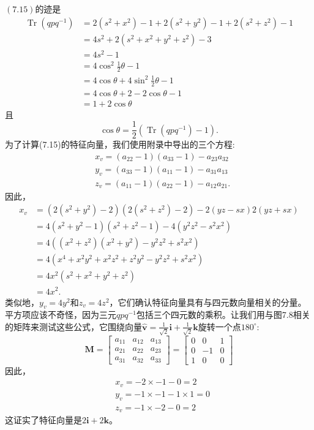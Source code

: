 $(7.15)$的迹是
$$
\begin{aligned}
\operatorname{Tr}\left(q p q^{-1}\right) & =2\left(s^{2}+x^{2}\right)-1+2\left(s^{2}+y^{2}\right)-1+2\left(s^{2}+z^{2}\right)-1 \\
& =4 s^{2}+2\left(s^{2}+x^{2}+y^{2}+z^{2}\right)-3 \\
& =4 s^{2}-1 \\
& =4 \cos ^{2} \frac{1}{2} \theta-1 \\
& =4 \cos \theta+4 \sin ^{2} \frac{1}{2} \theta-1 \\
& =4 \cos \theta+2-2 \cos \theta-1 \\
& =1+2 \cos \theta
\end{aligned}
$$
且
$$
\cos \theta=\frac{1}{2}\left(\operatorname{Tr}\left(q p q^{-1}\right)-1\right) .
$$
为了计算(7.15)的特征向量，我们使用附录中导出的三个方程:
$$
\begin{aligned}
& x_{v}=\left(a_{22}-1\right)\left(a_{33}-1\right)-a_{23} a_{32} \\
& y_{v}=\left(a_{33}-1\right)\left(a_{11}-1\right)-a_{31} a_{13} \\
& z_{v}=\left(a_{11}-1\right)\left(a_{22}-1\right)-a_{12} a_{21} .
\end{aligned}
$$
因此，
$$
\begin{aligned}
x_{v} & =\left(2\left(s^{2}+y^{2}\right)-2\right)\left(2\left(s^{2}+z^{2}\right)-2\right)-2(y z-s x) 2(y z+s x) \\
& =4\left(s^{2}+y^{2}-1\right)\left(s^{2}+z^{2}-1\right)-4\left(y^{2} z^{2}-s^{2} x^{2}\right) \\
& =4\left(\left(x^{2}+z^{2}\right)\left(x^{2}+y^{2}\right)-y^{2} z^{2}+s^{2} x^{2}\right) \\
& =4\left(x^{4}+x^{2} y^{2}+x^{2} z^{2}+z^{2} y^{2}-y^{2} z^{2}+s^{2} x^{2}\right) \\
& =4 x^{2}\left(s^{2}+x^{2}+y^{2}+z^{2}\right) \\
& =4 x^{2} .
\end{aligned}
$$
类似地，$y_{v}= 4y ^{2}$和$z_{v}= 4z ^{2}$，它们确认特征向量具有与四元数向量相关的分量。平方项应该不奇怪，因为三元$q p q^{-1}$包括三个四元数的乘积。让我们用与图7.8相关的矩阵来测试这些公式，它围绕向量$\hat{\mathbf{v}}=\frac{1}{\sqrt{2}} \mathbf{i}+\frac{1}{\sqrt{2}} \mathbf{k}$旋转一个点$180^{\circ}$:
$$
\mathbf{M}=\left[\begin{array}{lll}
a_{11} & a_{12} & a_{13} \\
a_{21} & a_{22} & a_{23} \\
a_{31} & a_{32} & a_{33}
\end{array}\right]=\left[\begin{array}{ccc}
0 & 0 & 1 \\
0 & -1 & 0 \\
1 & 0 & 0
\end{array}\right]
$$
因此，
$$
\begin{aligned}
& x_{v}=-2 \times-1-0=2 \\
& y_{v}=-1 \times-1-1 \times 1=0 \\
& z_{v}=-1 \times-2-0=2
\end{aligned}
$$
这证实了特征向量是$2 \mathbf{i}+2 \mathbf{k}$。

